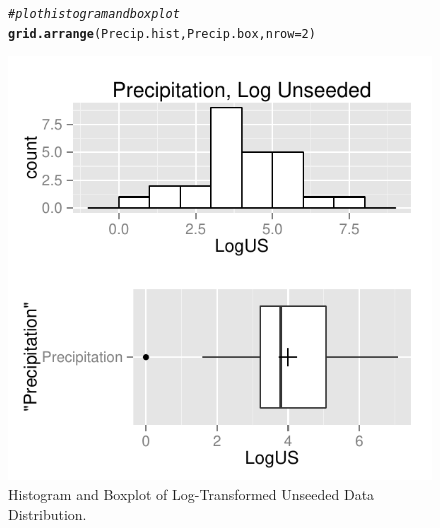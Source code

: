 \documentclass{article}\usepackage[]{graphicx}\usepackage[]{color}
\makeatletter
\def\maxwidth{ %
  \ifdim\Gin@nat@width>\linewidth
    \linewidth
  \else
    \Gin@nat@width
  \fi
}
\newcommand{\hlnum}[1]{\textcolor[rgb]{0.686,0.059,0.569}{#1}}%
\newcommand{\hlcom}[1]{\textcolor[rgb]{0.678,0.584,0.686}{\textit{#1}}}%
\newcommand{\hlstd}[1]{\textcolor[rgb]{0.345,0.345,0.345}{#1}}%
\newcommand{\hlkwc}[1]{\textcolor[rgb]{0.333,0.667,0.333}{#1}}%
\newcommand{\hlkwd}[1]{\textcolor[rgb]{0.737,0.353,0.396}{\textbf{#1}}}%
\newenvironment{kframe}{%
 \def\at@end@of@kframe{}%
 \ifinner\ifhmode%
  \def\at@end@of@kframe{\end{minipage}}%
  \begin{minipage}{\columnwidth}%
 \fi\fi%
 \def\FrameCommand##1{\hskip\@totalleftmargin \hskip-\fboxsep
 \colorbox{shadecolor}{##1}\hskip-\fboxsep
     \hskip-\linewidth \hskip-\@totalleftmargin \hskip\columnwidth}%
 \MakeFramed {\advance\hsize-\width
   \@totalleftmargin\z@ \linewidth\hsize
   \@setminipage}}%
 {\par\unskip\endMakeFramed%
 \at@end@of@kframe}
\newenvironment{knitrout}{}{} %
\makeatother
\begin{document}
\begin{figure}[H]
\begin{center}
\begin{knitrout}
\begin{kframe}
\begin{alltt}
\hlcom{# plot histogram and boxplot}
\hlkwd{grid.arrange}\hlstd{(Precip.hist, Precip.box,} \hlkwc{nrow} \hlstd{=} \hlnum{2}\hlstd{)}
\end{alltt}
\end{kframe}
\includegraphics[width=\maxwidth]{figure/1a_data_LogUS} 

\end{knitrout}
\end{center} \caption{Histogram and Boxplot of Log-Transformed Unseeded Data Distribution.} \end{figure}
\end{document}
